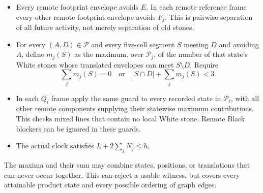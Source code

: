 \documentclass[11pt]{article}
\theoremstyle{definition}
\theoremstyle{remark}
\begin{document}
\begin{itemize}
\item Every remote footprint envelope avoids \(E\). In each remote reference frame every other remote footprint envelope avoids \(F_j\). This is pairwise separation of all future activity, not merely separation of old stones.
\item For every \((A,D)\in\mathcal P\) and every five-cell segment \(S\) meeting \(D\) and avoiding \(A\), define \(m_j(S)\) as the maximum, over \(\mathcal P_j\), of the number of that state's White stones whose translated envelopes can meet \(S\setminus D\). Require
  \[
  \sum_jm_j(S)=0\quad\text{or}\quad |S\cap D|+\sum_jm_j(S)<3.\tag{MI}
  \]
\item In each \(Q_i\) frame apply the same guard to every recorded state in \(\mathcal P_i\), with all other remote components supplying their statewise maximum contributions. This checks mixed lines that contain no local White stone. Remote Black blockers can be ignored in these guards.
\item The actual clock satisfies \(L+2\sum_jN_j\le h\).

\end{itemize}
The maxima and their sum may combine states, positions, or translations that can never occur together. This can reject a usable witness, but covers every attainable product state and every possible ordering of graph edges.
\end{document}
